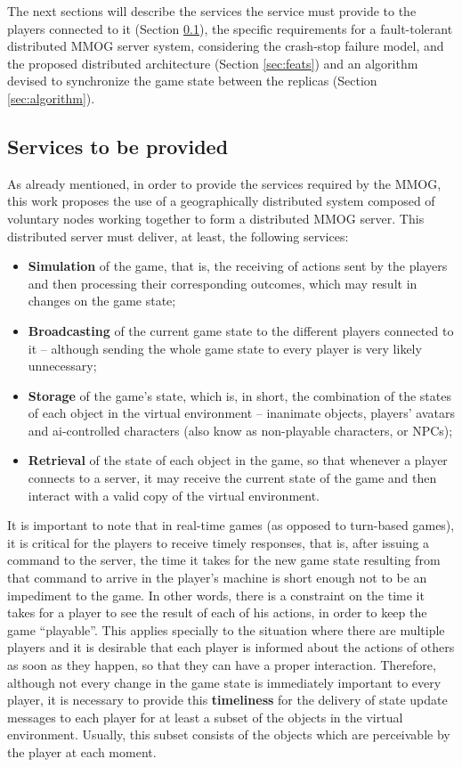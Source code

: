 \documentclass[]{usiinfprospectus}
\begin{document}
The next sections will describe the services the service must provide to the players connected to it (Section \ref{sec:services}), the specific requirements for a fault-tolerant distributed MMOG server system, considering the crash-stop failure model, and the proposed distributed architecture (Section \ref{sec:feats}) and an algorithm devised to synchronize the game state between the replicas (Section \ref{sec:algorithm}). 

\subsection{Services to be provided} \label{sec:services}

As already mentioned, in order to provide the services required by the MMOG, this work proposes the use of a geographically distributed system composed of voluntary nodes working together to form a distributed MMOG server. This distributed server must deliver, at least, the following services:

\begin{itemize}
	\item \textbf{Simulation} of the game, that is, the receiving of actions sent by the players and then processing their corresponding outcomes, which may result in changes on the game state;
	\item \textbf{Broadcasting} of the current game state to the different players connected to it -- although sending the whole game state to every player is very likely unnecessary;
	\item \textbf{Storage} of the game's state, which is, in short, the combination of the states of each object in the virtual environment -- inanimate objects, players' avatars and ai-controlled characters (also know as non-playable characters, or NPCs);
	\item \textbf{Retrieval} of the state of each object in the game, so that whenever a player connects to a server, it may receive the current state of the game and then interact with a valid copy of the virtual environment.
\end{itemize}

It is important to note that in real-time games (as opposed to turn-based games), it is critical for the players to receive timely responses, that is, after issuing a command to the server, the time it takes for the new game state resulting from that command to arrive in the player's machine is short enough not to be an impediment to the game. In other words, there is a constraint on the time it takes for a player to see the result of each of his actions, in order to keep the game ``playable''. This applies specially to the situation where there are multiple players and it is desirable that each player is informed about the actions of others as soon as they happen, so that they can have a proper interaction. Therefore, although not every change in the game state is immediately important to every player, it is necessary to provide this \textbf{timeliness} for the delivery of state update messages to each player for at least a subset of the objects in the virtual environment. Usually, this subset consists of the objects which are perceivable by the player at each moment.
\end{document}
